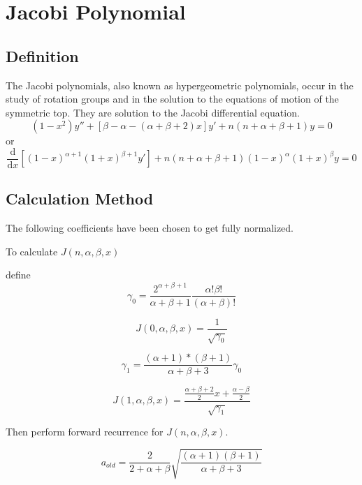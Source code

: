 \documentclass{article}
\newcommand{\ddx}{\frac{\mathrm{d}}{\mathrm{d}x}}
\begin{document}
\tableofcontents
\section{Jacobi Polynomial}
\subsection{Definition}
The Jacobi polynomials, also known as hypergeometric polynomials, occur in the study of rotation groups and in the solution to the equations of motion of the symmetric top. They are solution to the Jacobi differential equation.
\begin{equation}
(1-x^2)y''+[\beta-\alpha-(\alpha + \beta +2) x] y' + n(n+\alpha + \beta + 1) y = 0
\end{equation}
or
\begin{equation}
\ddx [(1-x)^{\alpha+1}(1+x)^{\beta+1}y']+n(n+\alpha + \beta + 1)(1-x)^\alpha(1+x)^\beta y = 0
\end{equation}

\subsection{Calculation Method}
The following coefficients have been chosen to get fully normalized.

To calculate $J(n,\alpha, \beta, x)$

define 
\begin{equation}
\gamma_0 = \frac{2^{\alpha+\beta + 1}}{\alpha + \beta + 1} \frac{\alpha!\beta!}{(\alpha+\beta)!}
\end{equation}

\begin{equation}
J(0,\alpha,\beta,x) = \frac{1}{\sqrt{\gamma_0}}
\end{equation}

\begin{equation}
\gamma_1 = \frac{(\alpha+1)*(\beta + 1)}{\alpha+\beta + 3} \gamma_0
\end{equation}

\begin{equation}
J(1,\alpha,\beta,x) = \frac{\frac{\alpha+\beta+2}{2}x+\frac{\alpha-\beta}{2}}{\sqrt{\gamma_1}}
\end{equation}

Then perform forward recurrence for $J(n,\alpha,\beta,x)$.

\begin{equation}
a_{old} = \frac{2}{2+\alpha+\beta} \sqrt{\frac{(\alpha+1)(\beta+1)}{\alpha+\beta+3}}
\end{equation}
\end{document}
